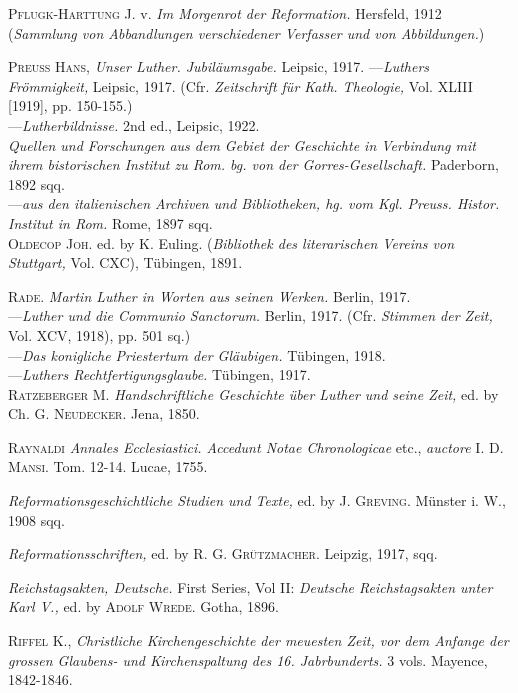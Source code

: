 \textsc{Pflugk-Harttung J.} v. \textit{Im Morgenrot der Reformation.} Hersfeld, 1912
(\textit{Sammlung von Abbandlungen verschiedener Verfasser und von Abbildungen.})

\textsc{Preuss Hans,} \textit{Unser Luther. Jubiläumsgabe.} Leipsic, 1917.
---\textit{Luthers Frömmigkeit,} Leipsic, 1917. (Cfr. \textit{Zeitschrift für Kath. Theologie,}
Vol. XLIII [1919], pp. 150-155.) \\
---\textit{Lutherbildnisse.} 2nd ed., Leipsic, 1922. \\

\textit{Quellen und Forschungen aus dem Gebiet der Geschichte in Verbindung
mit ihrem bistorischen Institut zu Rom. bg. von der Gorres-Gesellschaft.}
Paderborn, 1892 sqq. \\
---\textit{aus den italienischen Archiven und Bibliotheken, hg. vom Kgl. Preuss.
Histor. Institut in Rom.} Rome, 1897 sqq. \\

\textsc{Oldecop Joh.} ed. by K. Euling. (\textit{Bibliothek des literarischen Vereins von
Stuttgart,} Vol. CXC), Tübingen, 1891.

\textsc{Rade.} \textit{Martin Luther in Worten aus seinen Werken.} Berlin, 1917. \\
---\textit{Luther und die Communio Sanctorum.} Berlin, 1917. (Cfr. \textit{Stimmen der
Zeit,} Vol. XCV, 1918), pp. 501 sq.) \\
---\textit{Das konigliche Priestertum der Gläubigen.} Tübingen, 1918. \\
---\textit{Luthers Rechtfertigungsglaube.} Tübingen, 1917. \\

\textsc{Ratzeberger M.} \textit{Handschriftliche Geschichte über Luther und seine Zeit,}
ed. by Ch. \textsc{G. Neudecker.} Jena, 1850.

\textsc{Raynaldi} \textit{Annales Ecclesiastici. Accedunt Notae Chronologicae} etc., \textit{auctore}
\textsc{I. D. Mansi.} Tom. 12-14. Lucae, 1755.

\textit{Reformationsgeschichtliche Studien und Texte,} ed. by \textsc{J. Greving.} Münster i.
W., 1908 sqq.

\textit{Reformationsschriften,} ed. by \textsc{R. G. Grützmacher.} Leipzig, 1917, sqq.

\textit{Reichstagsakten, Deutsche.} First Series, Vol II: \textit{Deutsche Reichstagsakten
unter Karl V.,} ed. by \textsc{Adolf Wrede}. Gotha, 1896.

\textsc{Riffel K.}, \textit{Christliche Kirchengeschichte der meuesten Zeit, vor dem Anfange
der grossen Glaubens- und Kirchenspaltung des 16. Jabrbunderts.}
3 vols. Mayence, 1842-1846.

